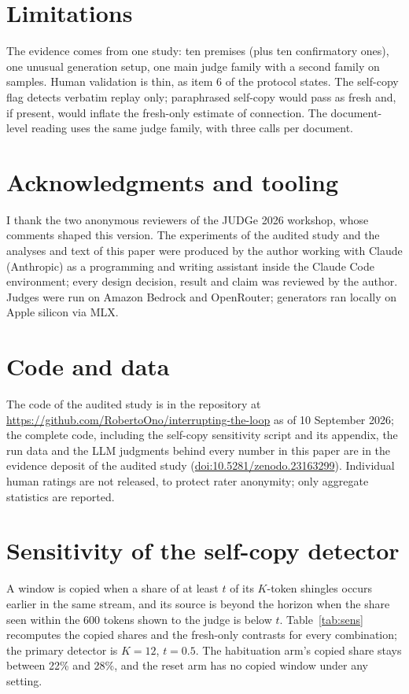 \documentclass[11pt]{article}
\newcommand{\evidencedoi}{10.5281/zenodo.23163299}
\begin{document}
\section{Limitations}

The evidence comes from one study: ten premises (plus ten confirmatory
ones), one unusual generation setup, one main judge family with a second
family on samples. Human validation is thin, as item 6 of the protocol
states. The self-copy flag detects verbatim replay only; paraphrased
self-copy would pass as fresh and, if present, would inflate the fresh-only
estimate of connection. The document-level reading uses the same judge
family, with three calls per document.

\section*{Acknowledgments and tooling}
I thank the two anonymous reviewers of the JUDGe 2026 workshop, whose
comments shaped this version. The experiments of the audited study and the
analyses and text of this paper were produced by the author working with
Claude (Anthropic) as a programming and writing assistant inside the Claude
Code environment; every design decision, result and claim was reviewed by
the author. Judges were run on Amazon Bedrock and OpenRouter; generators ran
locally on Apple silicon via MLX.

\section*{Code and data}
The code of the audited study is in the repository at
\url{https://github.com/RobertoOno/interrupting-the-loop} as of 10 September
2026; the complete code, including the self-copy sensitivity script and its
appendix, the run data and the LLM judgments behind every number in this paper
are in the evidence deposit of the audited study
(\href{https://doi.org/\evidencedoi}{doi:\evidencedoi}). Individual human
ratings are not released, to protect rater anonymity; only aggregate
statistics are reported.




\appendix
\section{Sensitivity of the self-copy detector}
\label{app:sens}

A window is copied when a share of at least $t$ of its $K$-token shingles
occurs earlier in the same stream, and its source is beyond the horizon when
the share seen within the 600 tokens shown to the judge is below $t$.
Table~\ref{tab:sens} recomputes the copied shares and the fresh-only
contrasts for every combination; the primary detector is $K=12$, $t=0.5$.
The habituation arm's copied share stays between 22\% and 28\%, and the reset
arm has no copied window under any setting.
\end{document}
